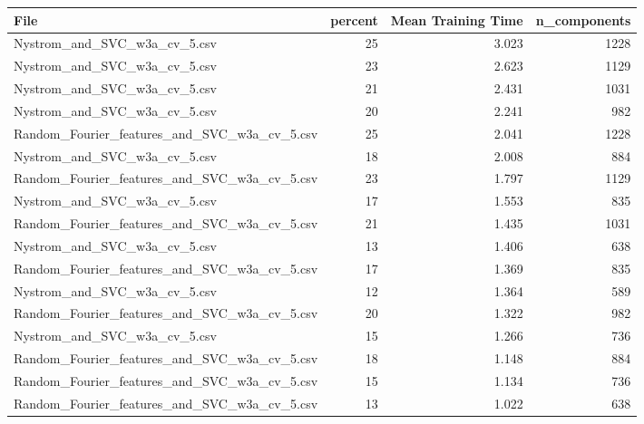 \begin{tabularx}{\textwidth}{lrrr}
\toprule
                                        File &  percent &  Mean Training Time &  n\_components \\
\midrule
                Nystrom\_and\_SVC\_w3a\_cv\_5.csv &       25 &               3.023 &          1228 \\
                Nystrom\_and\_SVC\_w3a\_cv\_5.csv &       23 &               2.623 &          1129 \\
                Nystrom\_and\_SVC\_w3a\_cv\_5.csv &       21 &               2.431 &          1031 \\
                Nystrom\_and\_SVC\_w3a\_cv\_5.csv &       20 &               2.241 &           982 \\
Random\_Fourier\_features\_and\_SVC\_w3a\_cv\_5.csv &       25 &               2.041 &          1228 \\
                Nystrom\_and\_SVC\_w3a\_cv\_5.csv &       18 &               2.008 &           884 \\
Random\_Fourier\_features\_and\_SVC\_w3a\_cv\_5.csv &       23 &               1.797 &          1129 \\
                Nystrom\_and\_SVC\_w3a\_cv\_5.csv &       17 &               1.553 &           835 \\
Random\_Fourier\_features\_and\_SVC\_w3a\_cv\_5.csv &       21 &               1.435 &          1031 \\
                Nystrom\_and\_SVC\_w3a\_cv\_5.csv &       13 &               1.406 &           638 \\
Random\_Fourier\_features\_and\_SVC\_w3a\_cv\_5.csv &       17 &               1.369 &           835 \\
                Nystrom\_and\_SVC\_w3a\_cv\_5.csv &       12 &               1.364 &           589 \\
Random\_Fourier\_features\_and\_SVC\_w3a\_cv\_5.csv &       20 &               1.322 &           982 \\
                Nystrom\_and\_SVC\_w3a\_cv\_5.csv &       15 &               1.266 &           736 \\
Random\_Fourier\_features\_and\_SVC\_w3a\_cv\_5.csv &       18 &               1.148 &           884 \\
Random\_Fourier\_features\_and\_SVC\_w3a\_cv\_5.csv &       15 &               1.134 &           736 \\
Random\_Fourier\_features\_and\_SVC\_w3a\_cv\_5.csv &       13 &               1.022 &           638 \\

\end{tabularx}
